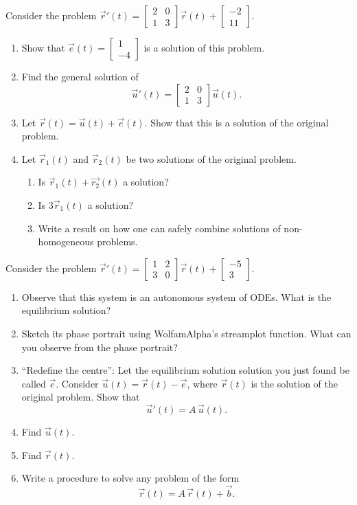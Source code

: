 \begin{exercises}
\begin{problist}
	\prob Consider the problem $\vec{r}'(t) = \begin{bmatrix} 2 & 0 \\ 1 & 3 \end{bmatrix} \vec{r}(t) + \begin{bmatrix} -2 \\ 11 \end{bmatrix}$.
	\begin{enumerate}
		\item Show that $\vec{e}(t) = \begin{bmatrix} 1 \\ -4 	\end{bmatrix}$ is a solution of this problem.
		\item Find the general solution of 
		$$\vec{u}'(t) = \begin{bmatrix} 2 & 0 \\ 1 & 3 \end{bmatrix} \vec{u}(t).$$
		\item Let $\vec{r}(t) = \vec{u}(t) + \vec{e}(t)$. Show that this is a solution of the original problem.
		\item Let $\vec{r}_1(t)$ and $\vec{r}_2(t)$ be two solutions of the original problem. 
		\begin{enumerate}
			\item Is $\vec{r}_1(t) + \vec{r_2}(t)$ a solution? 
			\item Is $3\vec{r}_1(t) $ a solution? 
			\item Write a result on how one can safely combine solutions of non-homogeneous problems.
		\end{enumerate}
	\end{enumerate}

	
	\prob \label{prob:sys-nonhomogeneous}Consider the problem  \quad $\vec{r}'(t) = \begin{bmatrix} 1 & 2 \\ 3 & 0 \end{bmatrix}
 \vec{r}(t)+\begin{bmatrix} -5 \\ 3 \end{bmatrix}
$.
	\begin{enumerate}
		\item Observe that this system is an autonomous system of ODEs. What is the equilibrium solution? 
		\item Sketch its phase portrait using WolfamAlpha's streamplot function. What can you observe from the phase portrait?
		\item ``Redefine the centre'': Let the equilibrium solution solution you just found be called $\vec{e}$. Consider $\vec{u}(t) = \vec{r}(t) - \vec{e}$, where $\vec{r}(t)$ is the solution of the original problem. Show that 
			$$ \vec{u}'(t) = A \, \vec{u}(t).$$
		\item Find $\vec{u}(t)$.
		\item Find $\vec{r}(t)$.
		\item Write a procedure to solve any problem of the form
			$$ \vec{r}(t) = A \, \vec{r}(t) + \vec{b}. $$
	\end{enumerate}
	

\end{problist}
\end{exercises}
